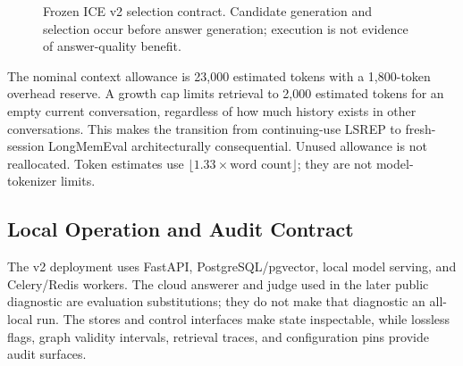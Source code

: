 \documentclass[twoside,11pt]{article}
\begin{document}
\begin{figure}[tbp]
\centering{}
\caption{Frozen ICE v2 selection contract. Candidate generation and selection occur before answer generation; execution is not evidence of answer-quality benefit.}
\label{fig:retrieval-algorithm}
\end{figure}

The nominal context allowance is 23,000 estimated tokens with a 1,800-token overhead reserve. A growth cap limits retrieval to 2,000 estimated tokens for an empty current conversation, regardless of how much history exists in other conversations. This makes the transition from continuing-use LSREP to fresh-session LongMemEval architecturally consequential. Unused allowance is not reallocated. Token estimates use $\lfloor1.33\times\text{word count}\rfloor$; they are not model-tokenizer limits.

\subsection{Local Operation and Audit Contract}
The v2 deployment uses FastAPI, PostgreSQL/pgvector, local model serving, and Celery/Redis workers. The cloud answerer and judge used in the later public diagnostic are evaluation substitutions; they do not make that diagnostic an all-local run. The stores and control interfaces make state inspectable, while lossless flags, graph validity intervals, retrieval traces, and configuration pins provide audit surfaces.
\end{document}
